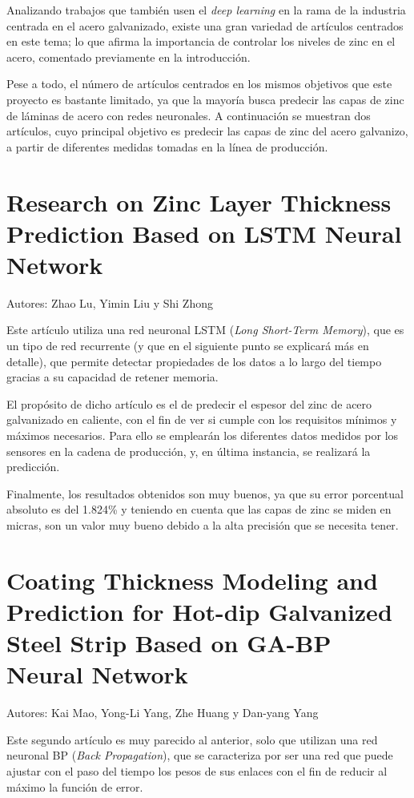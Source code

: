 
Analizando trabajos que también usen el \emph{deep learning} en la rama de la industria centrada en el acero galvanizado, existe una gran variedad de artículos centrados en este tema; lo que afirma la importancia de controlar los niveles de zinc en el acero, comentado previamente en la introducción. 

Pese a todo, el número de artículos centrados en los mismos objetivos que este proyecto es bastante limitado, ya que la mayoría busca predecir las capas de zinc de láminas de acero con redes neuronales. A continuación se muestran dos artículos, cuyo principal objetivo es predecir las capas de zinc del acero galvanizo, a partir de diferentes medidas tomadas en la línea de producción.

\section{Research on Zinc Layer Thickness Prediction Based on LSTM Neural Network}
Autores: Zhao Lu, Yimin Liu y Shi Zhong

Este artículo \cite{9602402} utiliza una red neuronal LSTM (\emph{Long Short-Term Memory}), que es un tipo de red recurrente (y que en el siguiente punto se explicará más en detalle), que permite detectar propiedades de los datos a lo largo del tiempo gracias a su capacidad de retener memoria.

El propósito de dicho artículo es el de predecir el espesor del zinc de acero galvanizado en caliente, con el fin de ver si cumple con los requisitos mínimos y máximos necesarios. Para ello se emplearán los diferentes datos medidos por los sensores en la cadena de producción, y, en última instancia, se realizará la predicción.

Finalmente, los resultados obtenidos son muy buenos, ya que su error porcentual absoluto es del 1.824\% y teniendo en cuenta que las capas de zinc se miden en micras, son un valor muy bueno debido a la alta precisión que se necesita tener.

\section{Coating Thickness Modeling and Prediction for Hot-dip Galvanized Steel Strip Based on GA-BP Neural Network}
Autores: Kai Mao, Yong-Li Yang, Zhe Huang y Dan-yang Yang

Este segundo artículo \cite{9164854} es muy parecido al anterior, solo que utilizan una red neuronal BP (\emph{Back Propagation}), que se caracteriza por ser una red que puede ajustar con el paso del tiempo los pesos de sus enlaces con el fin de reducir al máximo la función de error.

